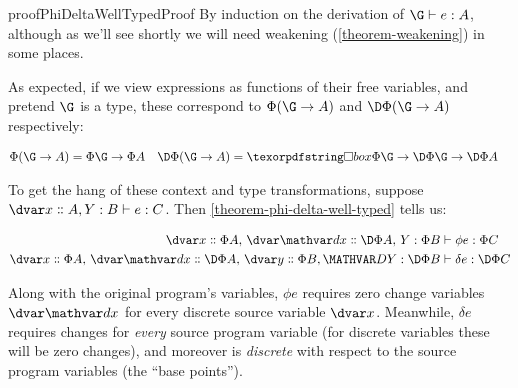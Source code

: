 \begin{restatable}{proof}{PhiDeltaWellTypedProof}
  By induction on the derivation of $\J e \G A$, although as we'll see shortly
  we will need weakening (\cref{theorem-weakening}) in some places.
\end{restatable}

\noindent As expected, if we view expressions as functions of their free
variables, and pretend $\G$ is a type, these correspond to $\Phi(\G \to A)$
and $\DP(\G \to A)$ respectively:

\begin{align*}
  \Phi(\G \to A) &= \Phi\G \to \Phi A
  & \DP(\G \to A) &= \iso\Phi\G \to \DP\G \to \DP A
\end{align*}

\noindent
To get the hang of these context and type transformations, suppose $\J
e {\hd x A, \hm y B} C$. Then \cref{theorem-phi-delta-well-typed} tells us:

\begin{align*}
  \Jalign{\phi e} {\hd x{\Phi A},\, \hd \dx {\DP A},\, \hm y {\Phi B}} {\Phi C}
  \\
  \Jalign{\delta e} {\hd x{\Phi A},\, \hd\dx{\DP A},\, \hd y{\Phi B}, \hm\dy{\DP B}} {\DP C}
\end{align*}


\noindent
Along with the original program's variables, $\phi e$ requires zero change
variables $\dvar\dx$ for every discrete source variable $\dvar x$. Meanwhile,
$\delta e$ requires changes for \emph{every} source program variable (for
discrete variables these will be zero changes), and moreover is \emph{discrete}
with respect to the source program variables (the ``base points'').

